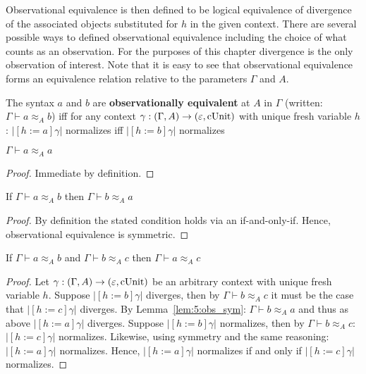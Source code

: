 Observational equivalence is then defined to be logical equivalence of divergence of the associated objects substituted for $h$ in the given context.
There are several possible ways to defined observational equivalence including the choice of what counts as an observation.
For the purposes of this chapter divergence is the only observation of interest.
Note that it is easy to see that observational equivalence forms an equivalence relation relative to the parameters $\Gamma$ and $A$.

\begin{definition}
    The syntax $a$ and $b$ are \textbf{observationally equivalent} at $A$ in $\Gamma$ (written: $\Gamma \vdash a \approx_A b$) iff
    for any context $\gamma : (\Gamma, A) \to (\varepsilon, \textnormal{cUnit})$ with unique fresh variable $h$: $|[h := a]\gamma|$ normalizes iff $|[h := b]\gamma|$ normalizes
\end{definition}

\begin{lemma}
    \label{lem:5:obs_refl}
    $\Gamma \vdash a \approx_A a$
\end{lemma}
\begin{proof}
    Immediate by definition.
\end{proof}

\begin{lemma}
    \label{lem:5:obs_sym}
    If $\Gamma \vdash a \approx_A b$ then $\Gamma \vdash b \approx_A a$
\end{lemma}
\begin{proof}
    By definition the stated condition holds via an if-and-only-if.
    Hence, observational equivalence is symmetric.
\end{proof}

\begin{lemma}
    \label{lem:5:obs_trans}
    If $\Gamma \vdash a \approx_A b$ and $\Gamma \vdash b \approx_A c$ then $\Gamma \vdash a \approx_A c$
\end{lemma}
\begin{proof}
    Let $\gamma : (\Gamma, A) \to (\varepsilon, \textnormal{cUnit})$ be an arbitrary context with unique fresh variable $h$.
    Suppose $|[h := b]\gamma|$ diverges, then by $\Gamma \vdash b \approx_A c$ it must be the case that $|[h := c]\gamma|$ diverges.
    By Lemma~\ref{lem:5:obs_sym}: $\Gamma \vdash b \approx_A a$ and thus as above $|[h := a]\gamma|$ diverges.
    Suppose $|[h := b]\gamma|$ normalizes, then by $\Gamma \vdash b \approx_A c$: $|[h := c]\gamma|$ normalizes.
    Likewise, using symmetry and the same reasoning: $|[h := a]\gamma|$ normalizes.
    Hence, $|[h := a]\gamma|$ normalizes if and only if $|[h := c]\gamma|$ normalizes.
\end{proof}

